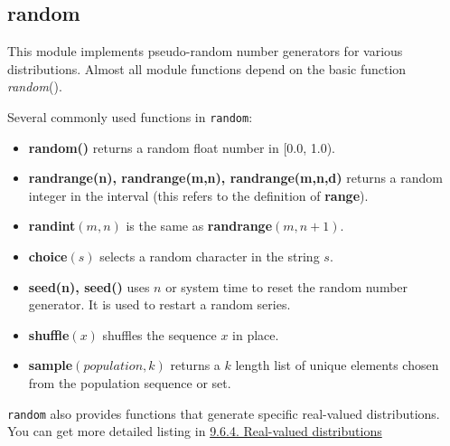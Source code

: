 \subsection{random}
This module implements pseudo-random number generators for various distributions. Almost all module functions depend on the basic function \textit{random}().

Several commonly used functions in \texttt{random}:
\begin{itemize}
\item \textbf{random()} returns a random float number in [0.0, 1.0).
\item \textbf{randrange(n), randrange(m,n), randrange(m,n,d)} returns a random integer in the interval (this refers to the definition of \textbf{range}).
\item \textbf{randint}$(m,n)$ is the same as \textbf{randrange}$(m,n+1)$.
\item \textbf{choice}$(s)$ selects a random character in the string $s$.
\item \textbf{seed(n), seed()} uses $n$ or system time to reset the random number generator. It is used to restart a random series.
\item \textbf{shuffle}$(x)$ shuffles the sequence $x$ in place.
\item \textbf{sample}$(population,k)$ returns a $k$ length list of unique elements chosen from the population sequence or set.
\end{itemize}
\texttt{random} also provides functions that generate specific real-valued distributions. You can get more detailed listing in \href{https://docs.python.org/3.6/library/random.html#real-valued-distributions}{9.6.4. Real-valued distributions}